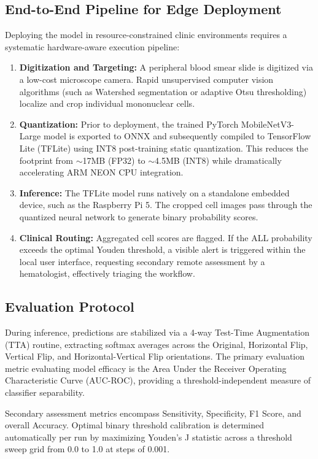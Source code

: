 \documentclass[journal]{IEEEtran}
\begin{document}
    \subsection{End-to-End Pipeline for Edge Deployment}
    Deploying the model in resource-constrained clinic environments requires a systematic hardware-aware execution pipeline:
    \begin{enumerate}
        \item \textbf{Digitization and Targeting:} A peripheral blood smear slide is digitized via a low-cost microscope camera. Rapid unsupervised computer vision algorithms (such as Watershed segmentation or adaptive Otsu thresholding) localize and crop individual mononuclear cells.
        \item \textbf{Quantization:} Prior to deployment, the trained PyTorch MobileNetV3-Large model is exported to ONNX and subsequently compiled to TensorFlow Lite (TFLite) using INT8 post-training static quantization. This reduces the footprint from $\sim$17MB (FP32) to $\sim$4.5MB (INT8) while dramatically accelerating ARM NEON CPU integration.
        \item \textbf{Inference:} The TFLite model runs natively on a standalone embedded device, such as the Raspberry Pi 5. The cropped cell images pass through the quantized neural network to generate binary probability scores.
        \item \textbf{Clinical Routing:} Aggregated cell scores are flagged. If the ALL probability exceeds the optimal Youden threshold, a visible alert is triggered within the local user interface, requesting secondary remote assessment by a hematologist, effectively triaging the workflow.
    \end{enumerate}

    \subsection{Evaluation Protocol}
    During inference, predictions are stabilized via a 4-way Test-Time Augmentation (TTA) routine, extracting softmax averages across the Original, Horizontal Flip, Vertical Flip, and Horizontal-Vertical Flip orientations. The primary evaluation metric evaluating model efficacy is the Area Under the Receiver Operating Characteristic Curve (AUC-ROC), providing a threshold-independent measure of classifier separability.

    Secondary assessment metrics encompass Sensitivity, Specificity, F1 Score, and overall Accuracy. Optimal binary threshold calibration is determined automatically per run by maximizing Youden's J statistic across a threshold sweep grid from 0.0 to 1.0 at steps of 0.001.
\end{document}
